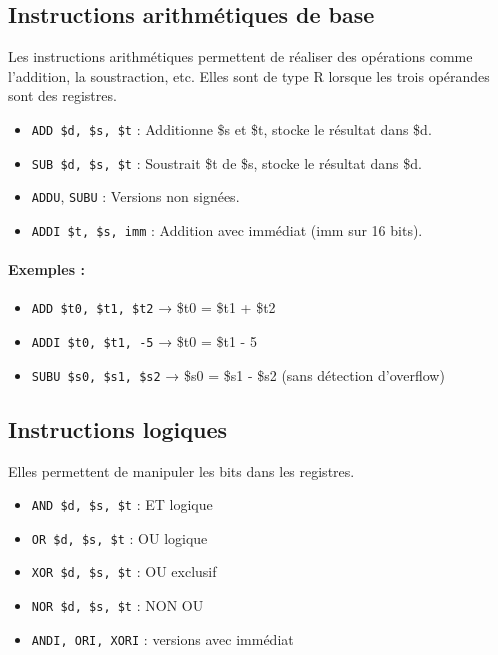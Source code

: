 \documentclass[12pt,a4paper]{article}
\begin{document}
\subsection{Instructions arithmétiques de base}
Les instructions arithmétiques permettent de réaliser des opérations comme l'addition, la soustraction, etc. Elles sont de type R lorsque les trois opérandes sont des registres.

\begin{itemize}
  \item \texttt{ADD \$d, \$s, \$t} : Additionne \$s et \$t, stocke le résultat dans \$d.
  \item \texttt{SUB \$d, \$s, \$t} : Soustrait \$t de \$s, stocke le résultat dans \$d.
  \item \texttt{ADDU}, \texttt{SUBU} : Versions non signées.
  \item \texttt{ADDI \$t, \$s, imm} : Addition avec immédiat (imm sur 16 bits).
\end{itemize}

\paragraph{Exemples :}
\begin{itemize}
  \item \texttt{ADD \$t0, \$t1, \$t2} → \$t0 = \$t1 + \$t2
  \item \texttt{ADDI \$t0, \$t1, -5} → \$t0 = \$t1 - 5
  \item \texttt{SUBU \$s0, \$s1, \$s2} → \$s0 = \$s1 - \$s2 (sans détection d’overflow)
\end{itemize}

\subsection{Instructions logiques}
Elles permettent de manipuler les bits dans les registres.

\begin{itemize}
  \item \texttt{AND \$d, \$s, \$t} : ET logique
  \item \texttt{OR \$d, \$s, \$t} : OU logique
  \item \texttt{XOR \$d, \$s, \$t} : OU exclusif
  \item \texttt{NOR \$d, \$s, \$t} : NON OU
  \item \texttt{ANDI, ORI, XORI} : versions avec immédiat
\end{itemize}
\end{document}
